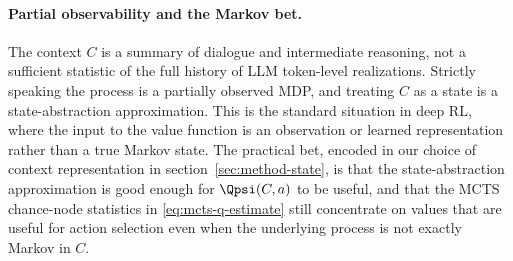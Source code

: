 \paragraph{Partial observability and the Markov bet.}
The context $C$ is a summary of dialogue and intermediate reasoning, not
a sufficient statistic of the full history of LLM token-level
realizations. Strictly speaking the process is a partially observed
MDP, and treating $C$ as a state is a state-abstraction approximation.
This is the standard situation in deep RL, where the input to the value
function is an observation or learned representation rather than a true
Markov state. The practical bet, encoded in our choice of context
representation in section~\ref{sec:method-state}, is that the
state-abstraction approximation is good enough for $\Qpsi(C, a)$ to be
useful, and that the MCTS chance-node statistics in
\eqref{eq:mcts-q-estimate} still concentrate on values that are useful
for action selection even when the underlying process is not exactly
Markov in $C$.
